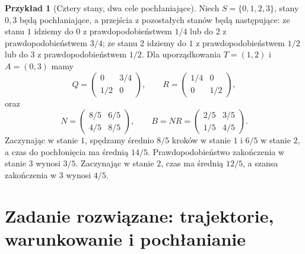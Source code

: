 \documentclass[11pt,a4paper,oneside]{report}
\numberwithin{equation}{chapter}
\theoremstyle{plain}
\theoremstyle{definition}
\newtheorem{przyklad}{Przykład}[chapter]
\theoremstyle{remark}
\begin{document}
\begin{przyklad}[Cztery stany, dwa cele pochłaniające]
Niech $S=\{0,1,2,3\}$, stany $0,3$ będą
pochłaniające, a przejścia z pozostałych
stanów będą następujące:
ze stanu $1$ idziemy do $0$ z prawdopodobieństwem
$1/4$ lub do $2$ z prawdopodobieństwem $3/4$;
ze stanu $2$ idziemy do $1$ z prawdopodobieństwem
$1/2$ lub do $3$ z prawdopodobieństwem $1/2$.
Dla uporządkowania $T=(1,2)$ i $A=(0,3)$ mamy
\[
Q=\begin{pmatrix}0&3/4\\1/2&0\end{pmatrix},
\qquad R=\begin{pmatrix}1/4&0\\0&1/2\end{pmatrix},
\]
oraz
\[
N=\begin{pmatrix}8/5&6/5\\4/5&8/5\end{pmatrix},
\qquad B=NR=\begin{pmatrix}2/5&3/5\\1/5&4/5\end{pmatrix}.
\]
Zaczynając w stanie $1$, spędzamy średnio
$8/5$ kroków w stanie $1$ i $6/5$ w stanie $2$,
a czas do pochłonięcia ma średnią $14/5$.
Prawdopodobieństwo zakończenia w stanie $3$
wynosi $3/5$. Zaczynając w stanie $2$, czas
ma średnią $12/5$, a szansa zakończenia w $3$
wynosi $4/5$.
\end{przyklad}


\section{Zadanie rozwiązane: trajektorie, warunkowanie i pochłanianie}
\end{document}
